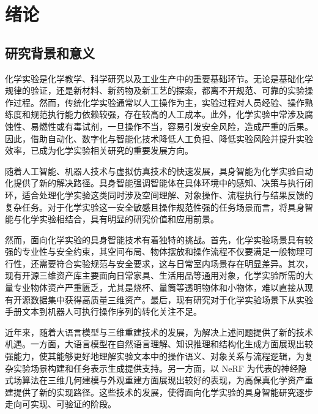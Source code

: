 

\chapter{绪论}
\label{chap:introduction}

\section{研究背景和意义}

化学实验是化学教学、科学研究以及工业生产中的重要基础环节。无论是基础化学规律的验证，还是新材料、新药物及新工艺的探索，都离不开规范、可靠的实验操作过程。然而，传统化学实验通常以人工操作为主，实验过程对人员经验、操作熟练度和规范执行能力依赖较强，存在较高的人工成本。此外，化学实验中常涉及腐蚀性、易燃性或有毒试剂，一旦操作不当，容易引发安全风险，造成严重的后果。因此，借助自动化、数字化与智能化技术降低人工负担、降低实验风险并提升实验效率，已成为化学实验相关研究的重要发展方向。

随着人工智能、机器人技术与虚拟仿真技术的快速发展，具身智能为化学实验自动化提供了新的解决路径。具身智能强调智能体在具体环境中的感知、决策与执行闭环，适合处理化学实验这类同时涉及空间理解、对象操作、流程执行与结果反馈的复杂任务。对于化学实验这一安全敏感且操作规范性强的任务场景而言，将具身智能与化学实验相结合，具有明显的研究价值和应用前景。

然而，面向化学实验的具身智能技术有着独特的挑战。首先，化学实验场景具有较强的专业性与安全约束，其空间布局、物体摆放和操作流程不仅要满足一般物理可行性，还需要符合实验规范与安全要求，这与日常室内场景存在明显差异。其次，现有开源三维资产库主要面向日常家具、生活用品等通用对象，化学实验所需的大量专业物体资产严重匮乏，尤其是烧杯、量筒等透明物体和小物体，难以直接从现有开源数据集中获得高质量三维资产。最后，现有研究对于化学实验场景下从实验手册文本到机器人可执行操作序列的转化关注不足。

近年来，随着大语言模型与三维重建技术的发展，为解决上述问题提供了新的技术机遇。一方面，大语言模型在自然语言理解、知识推理和结构化生成方面展现出较强能力，使其能够更好地理解实验文本中的操作语义、对象关系与流程逻辑，为复杂实验场景构建和任务表示生成提供支持。另一方面，以  NeRF\cite{mildenhall2020nerf}  为代表的神经隐式场算法在三维几何建模与外观重建方面展现出较好的表现，为高保真化学资产重建提供了新的实现路径。这些技术的发展，使得面向化学实验的具身智能研究逐步走向可实现、可验证的阶段。

